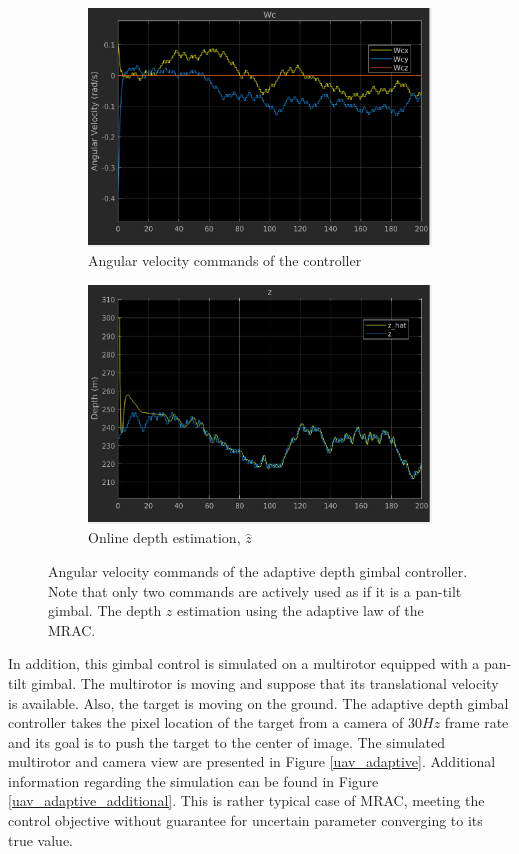 \begin{figure}[htbp]
	\centering
	\begin{subfigure}{0.5\textwidth}
		\centering
		\includegraphics[width=0.9\linewidth]{images/chapter2/angular_velocity_adaptive}
		\caption{Angular velocity commands of the controller}
	\end{subfigure}%
	\begin{subfigure}{0.5\textwidth}
		\centering
		\includegraphics[width=0.9\linewidth]{images/chapter2/z_adaptive}
		\caption{Online depth estimation, $\hat{z}$}
	\end{subfigure}
	\caption{Angular velocity commands of the adaptive depth gimbal controller. Note that only two commands are actively used as if it is a pan-tilt gimbal. The depth $z$ estimation using the adaptive law of the MRAC.}
	\label{adaptive_command}
\end{figure}

In addition, this gimbal control is simulated on a multirotor equipped with a pan-tilt gimbal. The multirotor is moving and suppose that its translational velocity is available. Also, the target is moving on the ground. The adaptive depth gimbal controller takes the pixel location of the target from a camera of $30Hz$ frame rate and its goal is to push the target to the center of image. The simulated multirotor and camera view are presented in Figure \ref{uav_adaptive}. Additional information regarding the simulation can be found in Figure \ref{uav_adaptive_additional}. This is rather typical case of MRAC, meeting the control objective without guarantee for uncertain parameter converging to its true value. 


